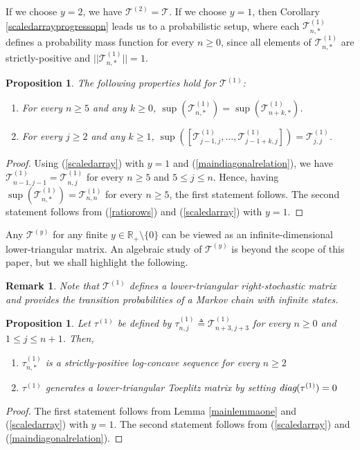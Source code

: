 \documentclass[a4paper,12pt]{article}
\newtheorem{rem}[thm]{Remark}
\newtheorem{prop}[thm]{Proposition}
\def\R{\mathbb{R}}
\def\T{\mathcal{T}}
\begin{document}
If we choose $y=2$, we have $\T^{(2)} = \T$. If we choose $y=1$, then Corollary \ref{scaledarrayprogressopn} leads us to a probabilistic setup, where each $\T^{(1)}_{n,*}$ defines a probability mass function for every $n\geq 0$, since all elements of $\T^{(1)}_{n,*}$ are strictly-positive and $||\T^{(1)}_{n,*}|| = 1$. 
\begin{prop}
\label{propforTprobproperties}
The following properties hold for $\T^{(1)}$:
\begin{enumerate}
\item For every $n\geq 5$ and any $k\geq 0$, $\sup(\T^{(1)}_{n,*}) = \sup(\T^{(1)}_{n+k,*})$.
\item For every $j\geq 2$ and any $k\geq 1$, $\sup([\T^{(1)}_{j-1,j},\ldots,\T^{(1)}_{j-1+k,j}]) = \T^{(1)}_{j,j}$.
\end{enumerate}
\end{prop}
\begin{proof}
Using (\ref{scaledarray}) with $y=1$ and (\ref{maindiagonalrelation}), we have $\T^{(1)}_{n-1,j-1} = \T^{(1)}_{n,j}$ for every $n\geq 5$ and $5 \leq j \leq n$. Hence, having $\sup(\T^{(1)}_{n,*})=\T^{(1)}_{n,n}$ for every $n\geq 5$, the first statement follows. The second statement follows from (\ref{ratiorows}) and (\ref{scaledarray}) with $y=1$.
\end{proof}
Any $\T^{(y)}$ for any finite $y\in\R_+\setminus\{0\}$ can be viewed as an infinite-dimensional lower-triangular matrix. An algebraic study of $\T^{(y)}$ is beyond the scope of this paper, but we shall highlight the following. 
\begin{rem}
\label{transitionmatrix}
Note that $\T^{(1)}$ defines a lower-triangular right-stochastic matrix and provides the transition probabilities of a Markov chain with infinite states.
\end{rem}
\begin{prop}
Let $\tau^{(1)}$ be defined by $\tau^{(1)}_{n,j} \triangleq \T^{(1)}_{n + 3, j + 3}$ for every $n \geq 0$ and $1 \leq j \leq n +1$. Then, 
\begin{enumerate}
\item $\tau^{(1)}_{n,*}$ is a strictly-positive log-concave sequence for every $n\geq 2$
\item $\tau^{(1)}$ generates a lower-triangular Toeplitz matrix by setting $\emph{diag}(\tau^{(1)}) = 0$  
\end{enumerate}
\end{prop}
\begin{proof}
The first statement follows from Lemma \ref{mainlemmaone} and (\ref{scaledarray}) with $y=1$. The second statement follows from (\ref{scaledarray}) and (\ref{maindiagonalrelation}).
\end{proof}
\end{document}
